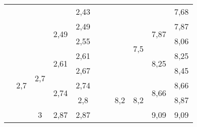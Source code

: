 \begin{table}[H]
\begin{tabular}{|c|c|c|c|c|c|c|c|c|c|c|}
                                    &                      &                      &                       & 2,43               &         &                                    &                       &                      &                       & 7,68               \\ \cline{4-5} \cline{9-11} 
                                    &                      &                      & \multirow{2}{*}{2,49} & 2,49               &         &                                    &                       & \multirow{4}{*}{7,5} & \multirow{2}{*}{7,87} & 7,87               \\ \cline{5-5} \cline{11-11} 
                                    &                      &                      &                       & 2,55               &         &                                    &                       &                      &                       & 8,06               \\ \cline{2-5} \cline{10-11} 
                                    & \multirow{8}{*}{2,7} & \multirow{4}{*}{2,7} & \multirow{2}{*}{2,61} & 2,61               &         &                                    &                       &                      & \multirow{2}{*}{8,25} & 8,25               \\ \cline{5-5} \cline{11-11} 
                                    &                      &                      &                       & 2,67               &         &                                    &                       &                      &                       & 8,45               \\ \cline{4-5} \cline{8-11} 
                                    &                      &                      & \multirow{2}{*}{2,74} & 2,74               &         &                                    & \multirow{6}{*}{8,2}  & \multirow{4}{*}{8,2} & \multirow{2}{*}{8,66} & 8,66               \\ \cline{5-5} \cline{11-11} 
                                    &                      &                      &                       & 2,8                &         &                                    &                       &                      &                       & 8,87               \\ \cline{3-5} \cline{10-11} 
                                    &                      & \multirow{4}{*}{3}   & \multirow{2}{*}{2,87} & 2,87               &         &                                    &                       &                      & \multirow{2}{*}{9,09} & 9,09               \\ \cline{5-5} \cline{11-11} 

\end{tabular}
\end{table}
